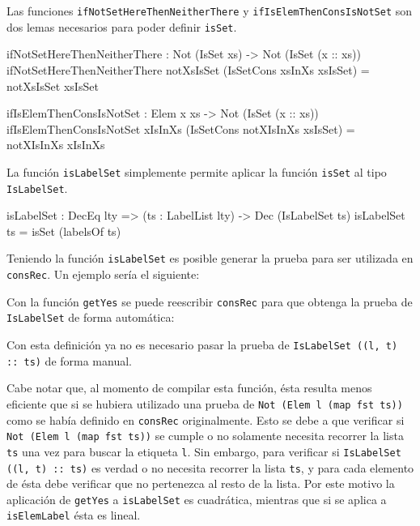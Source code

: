 Las funciones \texttt{ifNotSetHereThenNeitherThere} y \texttt{ifIsElemThenConsIsNotSet} son dos lemas necesarios para poder definir \texttt{isSet}.

\begin{code}
ifNotSetHereThenNeitherThere : Not (IsSet xs) ->
  Not (IsSet (x :: xs))
ifNotSetHereThenNeitherThere notXsIsSet
  (IsSetCons xsInXs xsIsSet) = notXsIsSet xsIsSet

ifIsElemThenConsIsNotSet : Elem x xs ->
  Not (IsSet (x :: xs))
ifIsElemThenConsIsNotSet xIsInXs
  (IsSetCons notXIsInXs xsIsSet) = notXIsInXs xIsInXs
\end{code}

La función \texttt{isLabelSet} simplemente permite aplicar la función \texttt{isSet} al tipo \texttt{IsLabelSet}.

\begin{code}
isLabelSet : DecEq lty => (ts : LabelList lty) ->
  Dec (IsLabelSet ts)
isLabelSet ts = isSet (labelsOf ts)
\end{code}

Teniendo la función \texttt{isLabelSet} es posible generar la prueba para ser utilizada en \texttt{consRec}. Un ejemplo sería el siguiente:


Con la función \texttt{getYes} se puede reescribir \texttt{consRec} para que obtenga la prueba de \texttt{IsLabelSet} de forma automática:


Con esta definición ya no es necesario pasar la prueba de \texttt{IsLabelSet ((l, t) :: ts)} de forma manual.

Cabe notar que, al momento de compilar esta función, ésta resulta menos eficiente que si se hubiera utilizado una prueba de \texttt{Not (Elem l (map fst ts))} como se había definido en \texttt{consRec} originalmente. Esto se debe a que verificar si \texttt{Not (Elem l (map fst ts))} se cumple o no solamente necesita recorrer la lista \texttt{ts} una vez para buscar la etiqueta \texttt{l}. Sin embargo, para verificar si \texttt{IsLabelSet ((l, t) :: ts)} es verdad o no necesita recorrer la lista \texttt{ts}, y para cada elemento de ésta debe verificar que no pertenezca al resto de la lista. Por este motivo la aplicación de \texttt{getYes} a \texttt{isLabelSet} es cuadrática, mientras que si se aplica a \texttt{isElemLabel} ésta es lineal.

